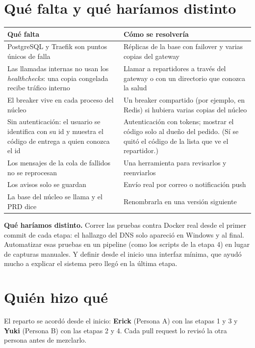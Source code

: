 \documentclass[11pt]{article}
\begin{document}
\section{Qué falta y qué haríamos distinto}

\begin{tabularx}{\linewidth}{@{}P{4.2cm} Y@{}}
\toprule
\textsf{\textbf{Qué falta}} & \textsf{\textbf{Cómo se resolvería}} \\
\midrule
PostgreSQL y Traefik son puntos únicos de falla & Réplicas de la base con failover y varias copias del gateway \\
Las llamadas internas no usan los \emph{healthchecks}: una copia congelada recibe tráfico interno & Llamar a repartidores a través del gateway o con un directorio que conozca la salud \\
El breaker vive en cada proceso del núcleo & Un breaker compartido (por ejemplo, en Redis) si hubiera varias copias del núcleo \\
Sin autenticación: el usuario se identifica con su id y  muestra el código de entrega a quien conozca el id & Autenticación con tokens; mostrar el código solo al dueño del pedido. (Sí se quitó el código de la lista que ve el repartidor.) \\
Los mensajes de la cola de fallidos no se reprocesan & Una herramienta para revisarlos y reenviarlos \\
Los avisos solo se guardan & Envío real por correo o notificación push \\
La base del núcleo se llama  y el PRD dice  & Renombrarla en una versión siguiente \\
\bottomrule
\end{tabularx}

\textbf{Qué haríamos distinto.} Correr las pruebas contra Docker real desde el primer commit de cada etapa:
el hallazgo del DNS solo apareció en Windows y al final. Automatizar esas pruebas en un pipeline (como los
scripts de la etapa 4) en lugar de capturas manuales. Y definir desde el inicio una interfaz mínima, que
ayudó mucho a explicar el sistema pero llegó en la última etapa.

\section{Quién hizo qué}

El reparto se acordó desde el inicio: \textbf{Erick} (Persona A) con las etapas 1 y 3 y \textbf{Yuki}
(Persona B) con las etapas 2 y 4. Cada pull request lo revisó la otra persona antes de mezclarlo.
\end{document}
